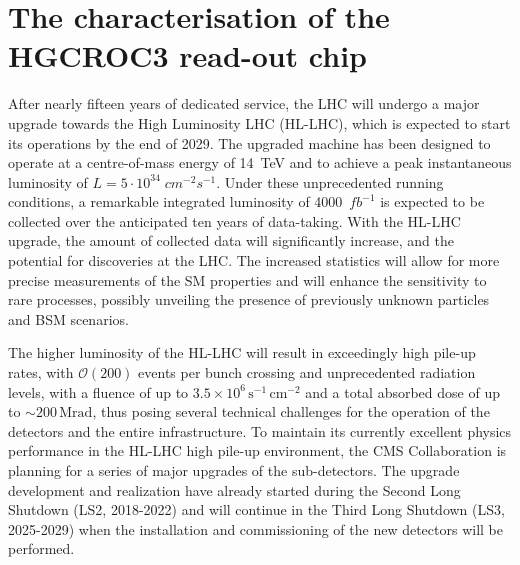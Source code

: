 



\chapter{The characterisation of the HGCROC3 read-out chip}
\label{chapter:The CMS Endcap Calorimeter Upgrade}

After nearly fifteen years of dedicated service, the LHC will undergo a major upgrade towards the High Luminosity LHC (HL-LHC), which is expected to start its operations by the end of 2029.
The upgraded machine has been designed to operate at a centre-of-mass energy of 14~TeV and to achieve a peak instantaneous luminosity of $L=5\cdot10^{34}\;cm^{-2}s^{-1}$.
Under these unprecedented running conditions, a remarkable integrated luminosity of 4000~$fb^{-1}$ is expected to be collected over the anticipated ten years of data-taking. 
With the HL-LHC upgrade, the amount of collected data will significantly increase, and the potential for discoveries at the LHC. 
The increased statistics will allow for more precise measurements of the SM properties and will enhance the sensitivity to rare processes, possibly unveiling the presence of previously unknown particles and BSM scenarios.

The higher luminosity of the HL-LHC will result in exceedingly high pile-up rates, with $\mathcal{O}(200)$ events per bunch crossing and unprecedented radiation levels, with a fluence of up to $3.5\times10^6\,\textrm{s}^{-1}\,\textrm{cm}^{-2}$ and a total absorbed dose of up to $\sim$$200\,\textrm{Mrad}$, thus posing several technical challenges for the operation of the detectors and the entire infrastructure.
To maintain its currently excellent physics performance in the HL-LHC high pile-up environment, the CMS Collaboration is planning for a series of major upgrades of the sub-detectors. The upgrade development and realization have already started during the Second Long Shutdown (LS2, 2018-2022) and will continue in the Third Long Shutdown (LS3, 2025-2029) when the installation and commissioning of the new detectors will be performed. 

